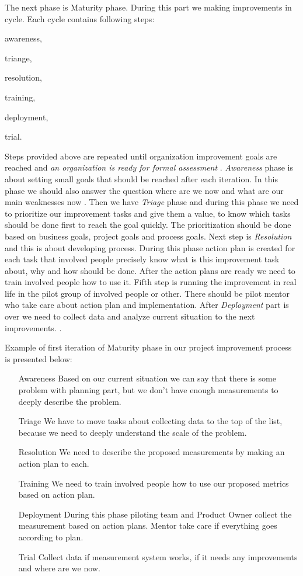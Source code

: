 The next phase is Maturity phase. During this part we making improvements in cycle. Each cycle contains following steps: 
\begin{inparaenum}
\item awareness,
\item triange,
\item resolution,
\item training,
\item deployment,
\item trial.
\end{inparaenum}
Steps provided above are repeated until organization improvement goals are reached and \textit{an organization is ready for formal assessment} \cite{jacobs_short}. \textit{Awareness} phase is about setting small goals that should be reached after each iteration. In this phase we should also answer the question where are we now and what are our main weaknesses now \cite{jacobs} \cite{jacobs_short}. Then we have \textit{Triage} phase and during this phase we need to prioritize our improvement tasks and give them a value, to know which tasks should be done first to reach the goal quickly. The prioritization should be done based on business goals, project goals and process goals. Next step is \textit{Resolution} and this is about developing process. During this phase action plan is created for each task that involved people precisely know what is this improvement task about, why and how should be done. After the action plans are ready we need to train involved people how to use it. Fifth step is running the improvement in real life in the pilot group of involved people or other. There should be pilot mentor who take care about action plan and implementation. After \textit{Deployment} part is over we need to collect data and analyze current situation to the next improvements. \cite{jacobs} \cite{jacobs_short}.

Example of first iteration of Maturity phase in our project improvement process is presented below:

\begin{enumerate}
\item[Awareness] Based on our current situation we can say that there is some problem with planning part, but we don't have enough measurements to deeply describe the problem. 
\item[Triage] We have to move  tasks about collecting data to the top of the list, because we need to deeply understand the scale of the problem.
\item[Resolution] We need to describe the proposed measurements by making an action plan to each.
\item[Training] We need to train involved people how to use our proposed metrics based on action plan.
\item[Deployment] During this phase piloting team and Product Owner collect the measurement based on action plans. Mentor take care if everything goes according to plan.
\item[Trial] Collect data if measurement system works, if it needs any improvements and where are we now.
\end{enumerate}


